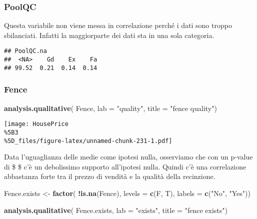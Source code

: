 \documentclass[
]{article}
\newenvironment{Shaded}{\begin{snugshade}}{\end{snugshade}}
\newcommand{\AttributeTok}[1]{\textcolor[rgb]{0.13,0.29,0.53}{#1}}
\newcommand{\FunctionTok}[1]{\textcolor[rgb]{0.13,0.29,0.53}{\textbf{#1}}}
\newcommand{\NormalTok}[1]{#1}
\newcommand{\OtherTok}[1]{\textcolor[rgb]{0.56,0.35,0.01}{#1}}
\newcommand{\SpecialCharTok}[1]{\textcolor[rgb]{0.81,0.36,0.00}{\textbf{#1}}}
\newcommand{\StringTok}[1]{\textcolor[rgb]{0.31,0.60,0.02}{#1}}
\begin{document}
\subsubsection{PoolQC}\label{poolqc-1}

Questa variabile non viene messa in correlazione perché i dati sono
troppo sbilanciati. Infatti la maggiorparte dei dati sta in una sola
categoria.

\begin{verbatim}
## PoolQC.na
##  <NA>    Gd    Ex    Fa 
## 99.52  0.21  0.14  0.14
\end{verbatim}

\subsubsection{Fence}\label{fence-1}

\begin{Shaded}
\begin{Highlighting}[]
\FunctionTok{analysis.qualitative}\NormalTok{(}
\NormalTok{    Fence,}
    \AttributeTok{lab =} \StringTok{"quality"}\NormalTok{,}
    \AttributeTok{title =} \StringTok{"fence quality"}\NormalTok{)}
\end{Highlighting}
\end{Shaded}

\texttt{[image: HousePrice\\\%5B3\\\%5D\_files/figure-latex/unnamed-chunk-231-1.pdf]}

Data l'uguaglianza delle medie come ipotesi nulla, osserviamo che con un
p-value di \$  \$ c'è un debolissimo supporto all'ipotesi
nulla. Quindi c'è una correlazione abbastanza forte tra il prezzo di
vendità e la qualità della recinzione.

\begin{Shaded}
\begin{Highlighting}[]
\NormalTok{Fence.exists }\OtherTok{\textless{}{-}} \FunctionTok{factor}\NormalTok{(}
    \SpecialCharTok{!}\FunctionTok{is.na}\NormalTok{(Fence),}
    \AttributeTok{levels =} \FunctionTok{c}\NormalTok{(F, T), }
    \AttributeTok{labels =} \FunctionTok{c}\NormalTok{(}\StringTok{"No"}\NormalTok{, }\StringTok{"Yes"}\NormalTok{))}

\FunctionTok{analysis.qualitative}\NormalTok{(}
\NormalTok{    Fence.exists,}
    \AttributeTok{lab =} \StringTok{"exists"}\NormalTok{,}
    \AttributeTok{title =} \StringTok{"fence exists"}\NormalTok{)}
\end{Highlighting}
\end{Shaded}
\end{document}
